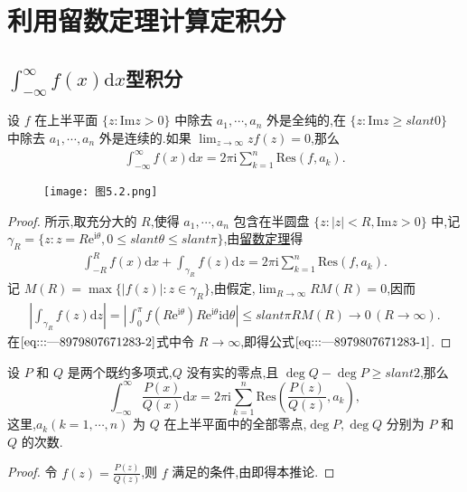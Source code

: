 \documentclass[../../main.tex]{subfiles}
\begin{document}
\section{利用留数定理计算定积分}

\subsection{$\int_{-\infty}^{\infty}{f\left( x \right) \mathrm{d}x}$型积分}

\begin{theorem}\label{theorem:定理5.5.1}
设 \( f \) 在上半平面 \( \{ z: \mathrm{Im}z > 0 \} \) 中除去 \( a_1, \cdots, a_n \) 外是全纯的,在 \( \{ z: \mathrm{Im}z \geqslant slant 0 \} \) 中除去 \( a_1, \cdots, a_n \) 外是连续的.如果 \( \lim_{z \to \infty} z f(z) = 0 \),那么
\begin{align}
\int_{-\infty}^{\infty} f(x) \mathrm{d}x = 2\pi \mathrm{i} \sum_{k = 1}^{n} \mathrm{Res}(f, a_k). \label{eq:::---8979807671283-1}
\end{align}
\end{theorem}
\begin{figure}[H]
\centering
\texttt{[image: 图5.2.png]}
\caption{}
\label{figure:图5.2}
\end{figure}
\begin{proof}
所示,取充分大的 \( R \),使得 \( a_1, \cdots, a_n \) 包含在半圆盘 \( \{ z: |z| < R, \mathrm{Im}z > 0 \} \) 中,记 \( \gamma_R = \{ z: z = R\mathrm{e}^{\mathrm{i}\theta}, 0 \leqslant slant \theta \leqslant slant \pi \} \),由\hyperref[theorem:留数定理(残数定理)-定理5.4.9]{留数定理}得
\begin{align}
\int_{-R}^{R} f(x) \mathrm{d}x + \int_{\gamma_R} f(z) \mathrm{d}z = 2\pi \mathrm{i} \sum_{k = 1}^{n} \mathrm{Res}(f, a_k).\label{eq:::---8979807671283-2}
\end{align}
记 \( M(R) = \max \{ |f(z)| : z \in \gamma_R \} \),由假定,\( \lim_{R \to \infty} R M(R) = 0 \),因而
\begin{align*}
\left| \int_{\gamma_R} f(z) \mathrm{d}z \right| = \left| \int_{0}^{\pi} f(R\mathrm{e}^{\mathrm{i}\theta}) R\mathrm{e}^{\mathrm{i}\theta} \mathrm{i} \mathrm{d}\theta \right| \leqslant slant \pi R M(R) \to 0 \, (R \to \infty).
\end{align*}
在\(\eqref{eq:::---8979807671283-2}\)式中令 \( R \to \infty \),即得公式\(\eqref{eq:::---8979807671283-1}\).
\end{proof}

\begin{corollary}\label{corollary:推论5.5.2}
设 \( P \) 和 \( Q \) 是两个既约多项式,\( Q \) 没有实的零点,且 \( \deg Q - \deg P \geqslant slant 2 \),那么
\[
\int_{-\infty}^{\infty} \frac{P(x)}{Q(x)} \mathrm{d}x = 2\pi \mathrm{i} \sum_{k = 1}^{n} \mathrm{Res}\left( \frac{P(z)}{Q(z)}, a_k \right),
\]
这里,\( a_k (k = 1, \cdots, n) \) 为 \( Q \) 在上半平面中的全部零点,\( \deg P, \deg Q \) 分别为 \( P \) 和 \( Q \) 的次数.
\end{corollary}
\begin{proof}
令 \( f(z) = \frac{P(z)}{Q(z)} \),则 \( f \) 满足的条件,由即得本推论.
\end{proof}
\end{document}
